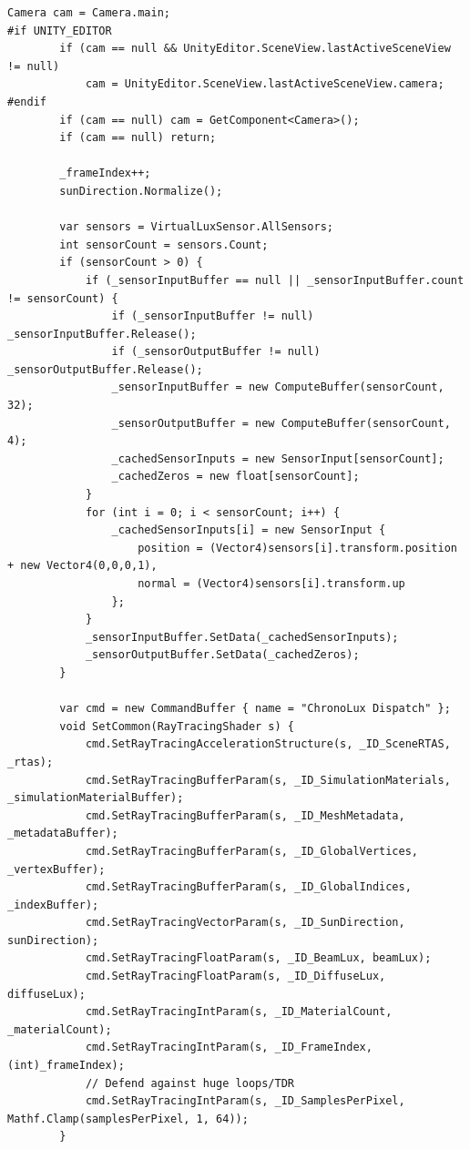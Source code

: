 \begin{lstlisting}[language={[Sharp]C}, caption={IrradianceBaker.cs: Orchestrates the hardware-accelerated DXR raytracing passes.}, label={lst:irradiancebaker}]
        Camera cam = Camera.main;
#if UNITY_EDITOR
        if (cam == null && UnityEditor.SceneView.lastActiveSceneView != null)
            cam = UnityEditor.SceneView.lastActiveSceneView.camera;
#endif
        if (cam == null) cam = GetComponent<Camera>();
        if (cam == null) return; 

        _frameIndex++;
        sunDirection.Normalize();

        var sensors = VirtualLuxSensor.AllSensors;
        int sensorCount = sensors.Count;
        if (sensorCount > 0) {
            if (_sensorInputBuffer == null || _sensorInputBuffer.count != sensorCount) {
                if (_sensorInputBuffer != null) _sensorInputBuffer.Release();
                if (_sensorOutputBuffer != null) _sensorOutputBuffer.Release();
                _sensorInputBuffer = new ComputeBuffer(sensorCount, 32);
                _sensorOutputBuffer = new ComputeBuffer(sensorCount, 4);
                _cachedSensorInputs = new SensorInput[sensorCount];
                _cachedZeros = new float[sensorCount];
            }
            for (int i = 0; i < sensorCount; i++) {
                _cachedSensorInputs[i] = new SensorInput { 
                    position = (Vector4)sensors[i].transform.position + new Vector4(0,0,0,1),
                    normal = (Vector4)sensors[i].transform.up
                };
            }
            _sensorInputBuffer.SetData(_cachedSensorInputs);
            _sensorOutputBuffer.SetData(_cachedZeros);
        }

        var cmd = new CommandBuffer { name = "ChronoLux Dispatch" };
        void SetCommon(RayTracingShader s) {
            cmd.SetRayTracingAccelerationStructure(s, _ID_SceneRTAS, _rtas);
            cmd.SetRayTracingBufferParam(s, _ID_SimulationMaterials, _simulationMaterialBuffer);
            cmd.SetRayTracingBufferParam(s, _ID_MeshMetadata, _metadataBuffer);
            cmd.SetRayTracingBufferParam(s, _ID_GlobalVertices, _vertexBuffer);
            cmd.SetRayTracingBufferParam(s, _ID_GlobalIndices, _indexBuffer);
            cmd.SetRayTracingVectorParam(s, _ID_SunDirection, sunDirection);
            cmd.SetRayTracingFloatParam(s, _ID_BeamLux, beamLux);
            cmd.SetRayTracingFloatParam(s, _ID_DiffuseLux, diffuseLux);
            cmd.SetRayTracingIntParam(s, _ID_MaterialCount, _materialCount);
            cmd.SetRayTracingIntParam(s, _ID_FrameIndex, (int)_frameIndex);
            // Defend against huge loops/TDR
            cmd.SetRayTracingIntParam(s, _ID_SamplesPerPixel, Mathf.Clamp(samplesPerPixel, 1, 64));
        }


\end{lstlisting}
